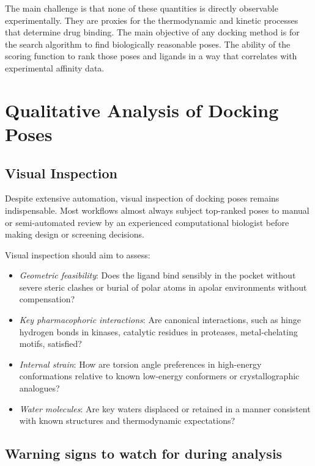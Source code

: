 \documentclass[12pt]{article}
\begin{document}
The main challenge is that none of these quantities is directly observable experimentally. They are proxies for the thermodynamic and kinetic processes that determine drug binding. The main objective of any docking method is for the search algorithm to find biologically reasonable poses. The ability of the scoring function to rank those poses and ligands in a way that correlates with experimental affinity data\cite{CH8_wang2005,CH8_Cheng2009}.

\section{Qualitative Analysis of Docking Poses}

\subsection{Visual Inspection}

Despite extensive automation, visual inspection of docking poses remains indispensable. Most workflows almost always subject top-ranked poses to manual or semi-automated review by an experienced computational biologist before making design or screening decisions\cite{CH8_Kitchen2004,CH8_Charting2015}.

Visual inspection should aim to assess:

\begin{itemize}
  \item \emph{Geometric feasibility}: Does the ligand bind sensibly in the pocket without severe steric clashes or burial of polar atoms in apolar environments without compensation?
  \item \emph{Key pharmacophoric interactions}: Are canonical interactions, such as hinge hydrogen bonds in kinases, catalytic residues in proteases, metal-chelating motifs, satisfied?
  \item \emph{Internal strain}: How are torsion angle preferences in high-energy conformations relative to known low-energy conformers or crystallographic analogues?
  \item \emph{Water molecules}: Are key waters displaced or retained in a manner consistent with known structures and thermodynamic expectations?
\end{itemize}

\subsection{Warning signs to watch for during analysis}
\end{document}
